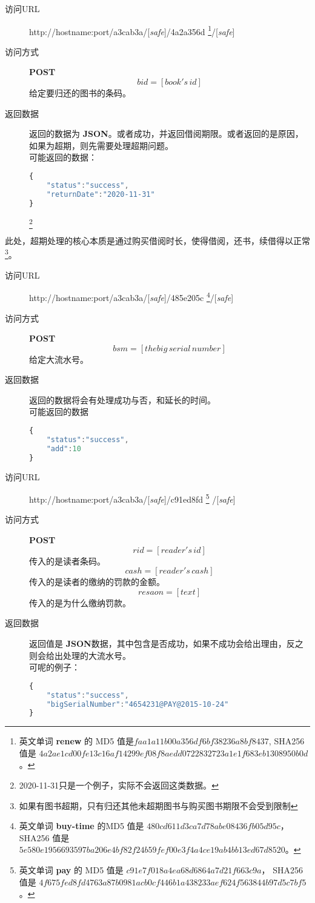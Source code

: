 \documentclass[UTF8]{article}
\def\safe{/[\textit{safe}]}
\def\POST{\colorbox[rgb]{0.77,0.53,0.97}{\textbf{POST}}}
\def\bfJSON{\textbf{JSON}}
\def\viaurl{\item[{\quad\colorbox[rgb]{0.47,0.88,0.89}{访问URL}}]}
\def\viareq#1{\item[{\quad\colorbox[rgb]{0.57,0.88,0.99}{访问方式}}] #1}
\def\rtdata{\item[{\quad\colorbox[rgb]{0.70,0.9,0.59}{返回数据}}]}
\begin{document}
        \begin{description}
	        \viaurl http://hostname:port/a3cab3a\safe/4a2a356d
		     \footnote{
		     	英文单词 \textbf{renew} 的
		     	MD5 值是$faa1a11b00a356df6bf38236a8bf8437$,
		     	SHA256 值是 $4a2ae1cd00fe13c16af14299ef08f8aedd0722832723a1e1f683eb1308950b0d$。
		     }\safe
		     \viareq{\POST}
		     $$bid=[book's\,id]$$
		     给定要归还的图书的条码。
		     \rtdata 返回的数据为 \bfJSON 。或者成功，并返回借阅期限。或者返回的是原因，如果为超期，则先需要处理超期问题。
		     \\ 可能返回的数据：
		     \begin{lstlisting}[language=JavaScript]
{
	"status":"success",
    "returnDate":"2020-11-31"
}
		     \end{lstlisting}
\footnote{2020-11-31只是一个例子，实际不会返回这类数据。}
		      \end{description}
        此处，超期处理的核心本质是通过购买借阅时长，使得借阅，还书，续借得以正常
        \footnote{如果有图书超期，只有归还其他未超期图书与购买图书期限不会受到限制}。
        \begin{description}
            \viaurl http://hostname:port/a3cab3a\safe/485e205c
            \footnote{
               英文单词 \textbf{buy-time} 的MD5 值是
                $480cd611d3ca7d78abe08436fb05d95c$，
                SHA256 值是
                $5e580e1956693597ba206e4bf82f24b59fef00e3f4a4ce19ab4bb13ed67d8520$。
            }\safe
            \viareq{\POST}
            $$bsm=[the big\,serial\,number ]$$
            给定大流水号。
            \rtdata 返回的数据将会有处理成功与否，和延长的时间。
            \\ 可能返回的数据
            \begin{lstlisting}[language=JavaScript]
{
    "status":"success",
    "add":10
}
            \end{lstlisting}
        \end{description}
        \begin{description}
	        \viaurl http://hostname:port/a3cab3a\safe/c91ed8fd
	        \footnote{英文单词 \textbf{pay} 的
	        	MD5 值是 $c91e7f018a4ea68d6864a7d21f663c9a$，
	        	SHA256 值是 $4f675fed8fd4763a87b0981acb0cf446b1a438233aef624f563844b97d5c7bf5$。
	        	}
	        \safe
	        \viareq{\POST}
	        $$rid=[reader's\,id]$$
	        传入的是读者条码。
	        $$cash=[reader's\,cash]$$
	        传入的是读者的缴纳的罚款的金额。
	        $$resaon=[text]$$
	        传入的是为什么缴纳罚款。
	        \rtdata 返回值是 \bfJSON 数据，其中包含是否成功，如果不成功会给出理由，反之则会给出处理的大流水号。
	        \\ 可呢的例子：
	        \begin{lstlisting}[language=JavaScript]
{
	"status":"success",
	"bigSerialNumber":"4654231@PAY@2015-10-24"
}
	        \end{lstlisting}
	    \end{description}
\end{document}
